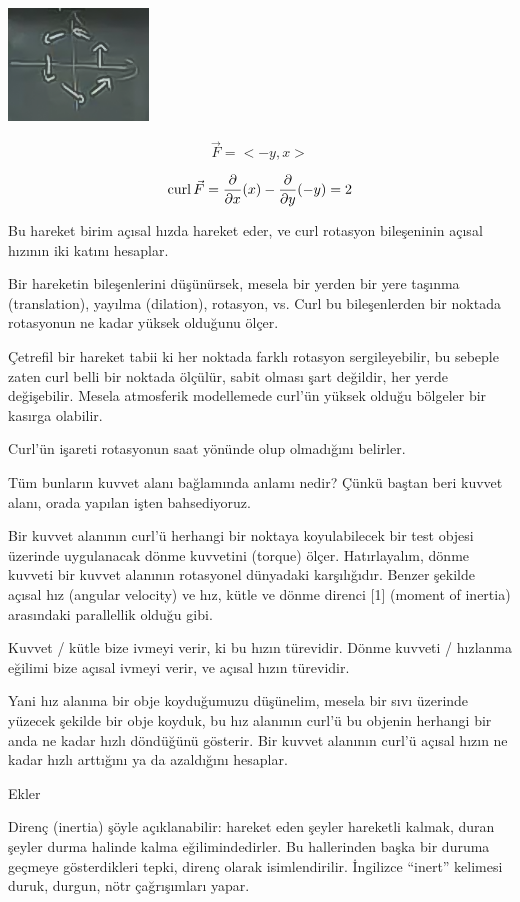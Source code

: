 \documentclass[12pt,fleqn]{article}\usepackage{../../common}
\begin{document}
\begin{center}

\includegraphics[height=3cm]{21_1.png}

\end{center}

$$ \vec{F} = <-y,x> $$

$$
\operatorname{curl} \vec{F} =
\frac{\partial }{\partial x}(x) -
\frac{\partial }{\partial y}(-y) = 2
$$

Bu hareket birim açısal hızda hareket eder, ve curl rotasyon bileşeninin açısal
hızının iki katını hesaplar.

Bir hareketin bileşenlerini düşünürsek, mesela bir yerden bir yere taşınma
(translation), yayılma (dilation), rotasyon, vs. Curl bu bileşenlerden bir
noktada rotasyonun ne kadar yüksek olduğunu ölçer.

Çetrefil bir hareket tabii ki her noktada farklı rotasyon sergileyebilir, bu
sebeple zaten curl belli bir noktada ölçülür, sabit olması şart değildir, her
yerde değişebilir. Mesela atmosferik modellemede curl'ün yüksek olduğu bölgeler
bir kasırga olabilir.

Curl'ün işareti rotasyonun saat yönünde olup olmadığını belirler. 

Tüm bunların kuvvet alanı bağlamında anlamı nedir? Çünkü baştan beri kuvvet
alanı, orada yapılan işten bahsediyoruz.

Bir kuvvet alanının curl'ü herhangi bir noktaya koyulabilecek bir test objesi
üzerinde uygulanacak dönme kuvvetini (torque) ölçer. Hatırlayalım, dönme kuvveti
bir kuvvet alanının rotasyonel dünyadaki karşılığıdır. Benzer şekilde açısal hız
(angular velocity) ve hız, kütle ve dönme direnci [1] (moment of inertia)
arasındaki parallellik olduğu gibi.

Kuvvet / kütle bize ivmeyi verir, ki bu hızın türevidir. Dönme kuvveti /
hızlanma eğilimi bize açısal ivmeyi verir, ve açısal hızın türevidir.

Yani hız alanına bir obje koyduğumuzu düşünelim, mesela bir sıvı üzerinde
yüzecek şekilde bir obje koyduk, bu hız alanının curl'ü bu objenin herhangi bir
anda ne kadar hızlı döndüğünü gösterir. Bir kuvvet alanının curl'ü açısal hızın
ne kadar hızlı arttığını ya da azaldığını hesaplar.

Ekler

Direnç (inertia) şöyle açıklanabilir: hareket eden şeyler hareketli kalmak,
duran şeyler durma halinde kalma eğilimindedirler. Bu hallerinden başka bir
duruma geçmeye gösterdikleri tepki, direnç olarak isimlendirilir. İngilizce
``inert'' kelimesi duruk, durgun, nötr çağrışımları yapar.
\end{document}
